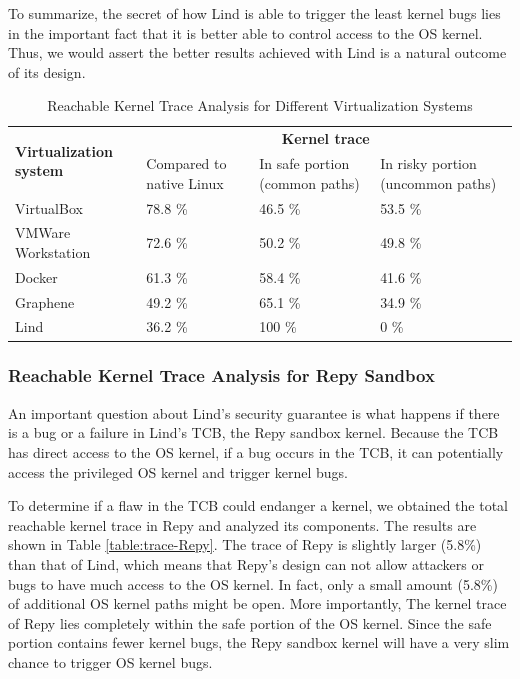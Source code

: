 To summarize, the secret of how Lind is able to trigger the least kernel
bugs lies in the important fact that 
it is better able to control access to the OS kernel. 
Thus, we would assert the better results achieved with Lind is a natural
outcome of its design.

\begin{table}
\centering
\scriptsize
\caption{Reachable Kernel Trace Analysis for Different Virtualization
Systems}
\begin{tabular}{|l|l|l|l|}
  \hline
  \multirow{3}{1.5cm}{\bf Virtualization system} & \multicolumn{3}{c|}{\bf Kernel trace} \\ \cline{2-4}
  & \multirow{2}{1.5cm}{Compared to native Linux} & \multirow{2}{1.8cm}{In safe portion 
  (common paths)} & \multirow{2}{2cm}{In risky portion (uncommon paths)} \\
  & & & \\  \hline
  VirtualBox & 78.8 \% & 46.5 \% & 53.5 \% \\
  \hline
  \multirow{2}{1.5cm}{VMWare Workstation} & \multirow{2}{*}{72.6 \%} & 
  \multirow{2}{*}{50.2 \%} & \multirow{2}{*}{49.8 \%} \\ 
  & & & \\   \hline
  Docker & 61.3 \% & 58.4 \% & 41.6 \% \\
  \hline
  Graphene & 49.2 \% & 65.1 \% & 34.9 \% \\
  \hline
  Lind & 36.2 \% & 100 \% & 0 \% \\
  \hline
\end{tabular}
\label{table:trace-systems}
\end{table}

\subsubsection{Reachable Kernel Trace Analysis for Repy Sandbox}
\label{Reachable-Kernel-Trace-Analysis-for-Repy-Sandbox}

An important question about Lind's security guarantee is what happens if
there is a bug or a failure in Lind's TCB, 
the Repy sandbox kernel. Because the TCB has direct access to the OS
kernel, if a bug occurs in the TCB, 
it can potentially access the privileged OS kernel and trigger kernel bugs. 

To determine if a flaw in the TCB could endanger a kernel, 
we obtained the total reachable kernel trace in Repy and analyzed its
components. 
The results are shown in Table \ref{table:trace-Repy}. The trace of Repy is
slightly larger (5.8\%) than that of Lind, 
which means that Repy's design can not allow attackers or bugs to 
have much access to the OS kernel. In fact, only a small amount (5.8\%) of
additional OS kernel paths might be open. 
More importantly, The kernel trace of Repy lies completely within the safe
portion of the OS kernel. 
Since the safe portion contains fewer kernel bugs, the Repy sandbox kernel
will have a very slim chance to trigger OS kernel bugs.

